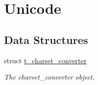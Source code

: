 \hypertarget{group__unicode}{
\section{Unicode}
\label{group__unicode}
}
\subsection*{Data Structures}
\begin{DoxyCompactItemize}
\item 
struct \hyperlink{structt__charset__converter}{t\_\-charset\_\-converter}
\begin{DoxyCompactList}\small\item\em The charset\_\-converter object. \item\end{DoxyCompactList}\end{DoxyCompactItemize}
